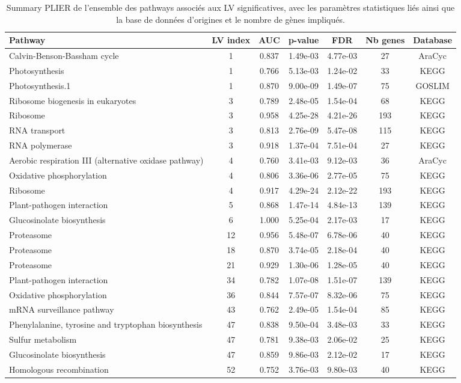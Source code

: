 \documentclass[twoside]{article}
\begin{document}
    \begin{table}[!h]
        \centering
        \begin{tabular}{lcccccc}
        \hline
         Pathway & LV index & AUC & p-value & FDR & Nb genes & Database\\
        \hline
        Calvin-Benson-Bassham cycle & 1 & 0.837 & 1.49e-03 & 4.77e-03 & 27 & AraCyc\\
        Photosynthesis & 1 & 0.766 & 5.13e-03 & 1.24e-02 & 33 & KEGG\\
        Photosynthesis.1 & 1 & 0.870 & 9.00e-09 & 1.49e-07 & 75 & GOSLIM\\
        Ribosome biogenesis in eukaryotes & 3 & 0.789 & 2.48e-05 & 1.54e-04 & 68 & KEGG\\
        Ribosome & 3 & 0.958 & 4.25e-28 & 4.21e-26 & 193 & KEGG\\
        RNA transport & 3 & 0.813 & 2.76e-09 & 5.47e-08 & 115 & KEGG\\
        RNA polymerase & 3 & 0.918 & 1.37e-04 & 7.51e-04 & 27 & KEGG\\
        Aerobic respiration III (alternative oxidase pathway) & 4 & 0.760 & 3.41e-03 & 9.12e-03 & 36 & AraCyc\\
        Oxidative phosphorylation & 4 & 0.806 & 3.36e-06 & 2.77e-05 & 75 & KEGG\\
        Ribosome & 4 & 0.917 & 4.29e-24 & 2.12e-22 & 193 & KEGG\\
        Plant-pathogen interaction & 5 & 0.868 & 1.47e-14 & 4.84e-13 & 139 & KEGG\\
        Glucosinolate biosynthesis & 6 & 1.000 & 5.25e-04 & 2.17e-03 & 17 & KEGG\\
        Proteasome & 12 & 0.956 & 5.48e-07 & 6.78e-06 & 40 & KEGG\\
        Proteasome & 18 & 0.870 & 3.74e-05 & 2.18e-04 & 40 & KEGG\\
        Proteasome & 21 & 0.929 & 1.30e-06 & 1.28e-05 & 40 & KEGG\\
        Plant-pathogen interaction & 34 & 0.782 & 1.07e-08 & 1.51e-07 & 139 & KEGG\\
        Oxidative phosphorylation & 36 & 0.844 & 7.57e-07 & 8.32e-06 & 75 & KEGG\\
        mRNA surveillance pathway & 43 & 0.762 & 2.49e-05 & 1.54e-04 & 85 & KEGG\\
        Phenylalanine, tyrosine and tryptophan biosynthesis & 47 & 0.838 & 9.50e-04 & 3.48e-03 & 33 & KEGG\\
        Sulfur metabolism & 47 & 0.781 & 9.38e-03 & 2.06e-02 & 25 & KEGG\\
        Glucosinolate biosynthesis & 47 & 0.859 & 9.86e-03 & 2.12e-02 & 17 & KEGG\\
        Homologous recombination & 52 & 0.752 & 3.76e-03 & 9.80e-03 & 40 & KEGG\\
        \hline
        \end{tabular}
        \caption[]{\label{an:lv_sig}Summary PLIER de l'ensemble des pathways associés aux LV significatives, avec les paramètres statistiques liés ainsi que la base de données d'origines et le nombre de gènes impliqués.}
    \end{table}
\end{document}
